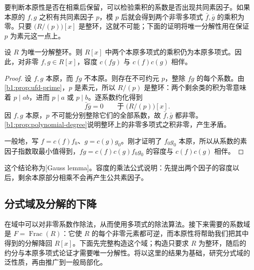 \ProseParagraphBreak
要判断本原性是否在相乘后保留，可以检验乘积的系数是否出现共同素因子。如果本原的 \(f,g\) 之积有共同素因子 \(p\)，模 \(p\) 后就会得到两个非零多项式 \(\bar f,\bar g\) 的乘积为零。只要 \(\bigl(R/(p)\bigr)[x]\) 是整环，这就不可能；下面的证明将唯一分解性用在保证 \(p\) 为素元这一点上。

\begin{lemma}[Gauss]\label{b1:lem:gauss-primitive}
	设 \(R\) 为唯一分解整环。则 \(R[x]\) 中两个本原多项式的乘积仍为本原多项式。因此，对非零 \(f,g\in R[x]\)，容度 \(c(fg)\) 与 \(c(f)c(g)\) 相伴。
\end{lemma}
\begin{proof}
	设 \(f,g\) 本原，而 \(fg\) 不本原。则存在不可约元 \(p\)，整除 \(fg\) 的每个系数。由\cref{b1:prop:ufd-prime}，\(p\) 是素元，所以 \(R/(p)\) 是整环：两个剩余类的积为零意味着 \(p\mid ab\)，进而 \(p\mid a\) 或 \(p\mid b\)。逐系数约化得到
	\[
		\bar f\bar g=0\qquad\text{于}\;\bigl(R/(p)\bigr)[x].
	\]
	因 \(f,g\) 本原，\(p\) 不可能分别整除它们的全部系数，故 \(\bar f,\bar g\) 都非零。\cref{b1:prop:polynomial-degree}说明整环上的非零多项式之积非零，产生矛盾。

	一般地，写 \(f=c(f)f_0\)、\(g=c(g)g_0\)。刚才证明了 \(f_0g_0\) 本原，所以从系数的素因子指数取最小值得到，\(fg=c(f)c(g)f_0g_0\) 的容度与 \(c(f)c(g)\) 相伴。
\end{proof}

这个结论称为[Gauss lemma]。容度的乘法公式说明：先提出两个因子的容度以后，剩余本原部分相乘不会再产生公共素因子。

\subsection{分式域及分解的下降}
\label{b1:subsec:1202:02}

在域中可以对非零系数作除法，从而使用多项式的除法算法。接下来需要的系数域是 \(F=\operatorname{Frac}(R)\)：它使 \(R\) 的每个非零元素都可逆，而本原性将帮助我们把其中得到的分解降回 \(R[x]\)。下面先完整构造这个域；构造只要求 \(R\) 为整环，随后的约分与本原多项式论证才需要唯一分解性。将以这里的结果为基础，研究分式域的泛性质，再由推广到一般局部化。

